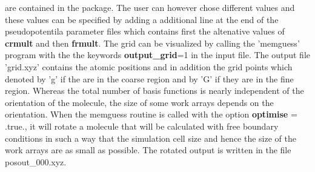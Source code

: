 \documentclass[a4paper,11pt]{report}
\begin{document}
are contained in the package. The user can however chose different values and these values can be specified by 
adding a additional line at the end of the pseudopotentila parameter files which contains first the altenative 
values of {\bf crmult} and then {\bf frmult}. The grid can be visualized by calling the 'memguess' program 
with the the keywords {\bf output_grid}=1 in the input file. The output file 'grid.xyz' contains the atomic positions and in addition 
the grid points which denoted by 'g' if the are in the coarse region and by 'G' if they are in the fine region. 
Whereas the total number of basis functions is nearly independent of the orientation of the molecule, the size of some 
work arrays depends on the orientation. When the memguess routine is called with the option {\bf optimise} = .true., it will rotate 
a molecule that will be calculated with free boundary conditions in such a way that the simulation cell size and 
hence the size of the work arrays are as small as 
possible. The rotated output is written in the file posout\_000.xyz.
\end{document}
